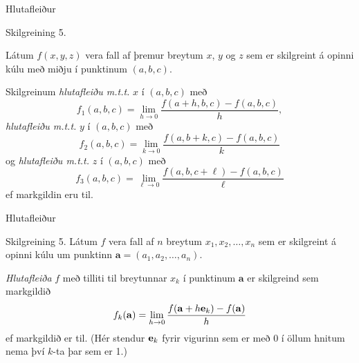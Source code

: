 \newpage
\begin {frame}{Hlutafleiður}
\begin {block}{Skilgreining 5.}
  
Látum $f(x,y,z)$ vera fall af þremur breytum $x$, $y$ og $z$ sem er skilgreint á opinni kúlu með miðju í punktinum $(a, b,c)$. 

\medskip

Skilgreinum \emph{hlutafleiðu m.t.t.} $x$ í $(a,b,c)$ með
$$f_1(a,b,c)=\lim_{h\rightarrow 0}\frac{f(a+h,b,c)-f(a,b,c)}{h},$$
 \emph{hlutafleiðu m.t.t.} $y$ í $(a,b,c)$ með
$$f_2(a,b,c)=\lim_{k\rightarrow 0}\frac{f(a,b+k,c)-f(a,b,c)}{k}$$
og  \emph{hlutafleiðu m.t.t.} $z$ í $(a,b,c)$ með
$$f_3(a,b,c)=\lim_{\ell\rightarrow 0}\frac{f(a,b,c+\ell)-f(a,b,c)}{\ell}$$
ef markgildin eru til.
 \end {block}

\end {frame}




\begin{frame}{Hlutafleiður} 

\begin {block}{Skilgreining 5.}
Látum $f$ vera fall af
$n$ breytum $x_1,x_2,\ldots,x_n$ sem er skilgreint á opinni kúlu um punktinn $\mathbf{a}=(a_1, a_2, \ldots, a_n).$ 

\medskip	
{\em Hlutafleiða} $f$ með
tilliti til breytunnar $x_k$ í punktinum $\mathbf{a}$ er skilgreind sem markgildið 
$$f_k(\mathbf{a})=\lim_{h\rightarrow 0}\frac{f(\mathbf{a}+h\mbox{${\bf e}$}_k)-f(\mathbf{a})}{h}$$
ef markgildið er til.  (Hér stendur $\mbox{${\bf e}$}_k$ fyrir vigurinn sem er með
0 í öllum hnitum nema því $k$-ta þar sem er 1.)
\end{block}

\end{frame}





\begin {frame}

\end {frame}

